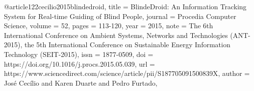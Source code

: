 @article{122cecilio2015blindedroid,
title = {BlindeDroid: An Information Tracking System for Real-time Guiding of Blind People},
journal = {Procedia Computer Science},
volume = {52},
pages = {113-120},
year = {2015},
note = {The 6th International Conference on Ambient Systems, Networks and Technologies (ANT-2015), the 5th International Conference on Sustainable Energy Information Technology (SEIT-2015)},
issn = {1877-0509},
doi = {https://doi.org/10.1016/j.procs.2015.05.039},
url = {https://www.sciencedirect.com/science/article/pii/S187705091500839X},
author = {José Cecílio and Karen Duarte and Pedro Furtado},
}
